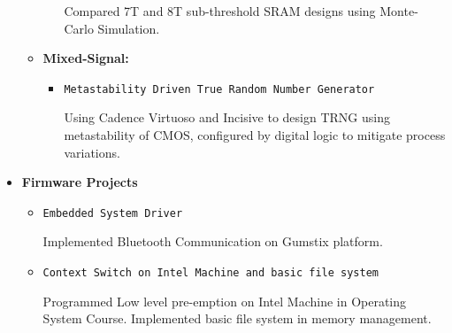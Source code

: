 \documentclass[]{article}
\begin{document}
\begin{itemize}
\begin{itemize}
\begin{itemize}
            Compared 7T and 8T sub-threshold SRAM designs using Monte-Carlo Simulation.

        \end{itemize}

        \item \textbf{Mixed-Signal:}

        \begin{itemize}
            \item \verb+Metastability Driven True Random Number Generator+

            Using Cadence Virtuoso and Incisive to design TRNG using metastability of CMOS,
            configured by digital logic to mitigate process variations.

        \end{itemize}

    \end{itemize}

    \item \textbf{Firmware Projects}

    \begin{itemize}

        \item \verb+Embedded System Driver+

        Implemented Bluetooth Communication on Gumstix platform.

        \item \verb+Context Switch on Intel Machine and basic file system+

        Programmed Low level pre-emption on Intel Machine in Operating System
        Course. Implemented basic file system in memory management.

    \end{itemize}







\end{itemize}
\end{document}
